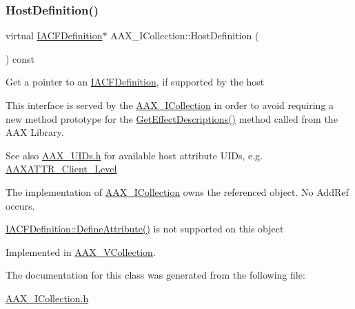\mbox{\label{a01777_a8346a9084bf81e1834990aec2685640b}} 
\subsubsection{\texorpdfstring{HostDefinition()}{HostDefinition()}}
{\footnotesize\ttfamily virtual \mbox{\hyperlink{a01413}{I\+A\+C\+F\+Definition}}$\ast$ A\+A\+X\+\_\+\+I\+Collection\+::\+Host\+Definition (\begin{DoxyParamCaption}{ }\end{DoxyParamCaption}) const\hspace{0.3cm}{\ttfamily [pure virtual]}}

Get a pointer to an \mbox{\hyperlink{a01413}{I\+A\+C\+F\+Definition}}, if supported by the host

This interface is served by the \mbox{\hyperlink{a01777}{A\+A\+X\+\_\+\+I\+Collection}} in order to avoid requiring a new method prototype for the \mbox{\hyperlink{a00796_gae0d356eef326f77cbb972e48946d4892}{Get\+Effect\+Descriptions()}} method called from the A\+AX Library.

\begin{DoxySeeAlso}{See also}
\mbox{\hyperlink{a00683}{A\+A\+X\+\_\+\+U\+I\+Ds.\+h}} for available host attribute U\+I\+Ds, e.\+g. \mbox{\hyperlink{a00683_a1bbc82d62cf23079e92826874381a891}{A\+A\+X\+A\+T\+T\+R\+\_\+\+Client\+\_\+\+Level}}
\end{DoxySeeAlso}
The implementation of \mbox{\hyperlink{a01777}{A\+A\+X\+\_\+\+I\+Collection}} owns the referenced object. No Add\+Ref occurs.

\mbox{\hyperlink{a01413_abf9f28b14b95f0835857a9096d108989}{I\+A\+C\+F\+Definition\+::\+Define\+Attribute()}} is not supported on this object 

Implemented in \mbox{\hyperlink{a01897_a9ca97f39ce8e458da67a4c1f4a7a7a4b}{A\+A\+X\+\_\+\+V\+Collection}}.



The documentation for this class was generated from the following file\+:\begin{DoxyCompactItemize}
\item 
\mbox{\hyperlink{a00566}{A\+A\+X\+\_\+\+I\+Collection.\+h}}\end{DoxyCompactItemize}
